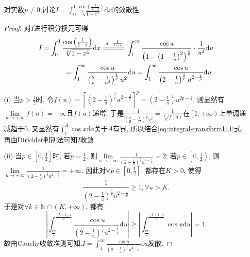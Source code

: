 \documentclass[../../main.tex]{subfiles}%
\begin{document}
\begin{example}
对实数$p\ne 0$,讨论$I = \int_0^1{\frac{\cos(\frac{1}{1 - x})}{\sqrt[p]{1 - x^2}}\mathrm{d}x}$的敛散性.
\end{example}
\begin{proof}

对$I$进行积分换元可得
\begin{align}
I=\int_0^1{\frac{\cos\left(\frac{1}{1-x}\right)}{\sqrt[p]{1-x^2}}\mathrm{d}x}\xlongequal{u=\frac{1}{1-x}}\int_1^{\infty}{\frac{\cos u}{\left( 1-\left( 1-\frac{1}{u} \right) ^2 \right) ^{\frac{1}{p}}}\cdot \frac{1}{u^2}\mathrm{d}u} \notag \\
=\int_1^{\infty}{\frac{\cos u}{\left( \frac{2}{u}-\frac{1}{u^2} \right) ^{\frac{1}{p}}u^2}\mathrm{d}u}=\int_1^{\infty}{\frac{\cos u}{\left( 2-\frac{1}{u} \right) ^{\frac{1}{p}}u^{2-\frac{1}{p}}}\mathrm{d}u}.\label{eq:integral-transform111}
\end{align}

(i) 当$p>\frac{1}{2}$时, 令$f\left( u \right) =\left[ \left( 2-\frac{1}{u} \right) ^{\frac{1}{p}}u^{2-\frac{1}{p}} \right] ^p=\left( 2-\frac{1}{u} \right) u^{2p-1}$, 则显然有$\underset{u\rightarrow +\infty}{\lim}f\left( u \right) =+\infty$且$f\left( u \right)$递增. 于是$\frac{1}{\left( \frac{2}{u}-\frac{1}{u^2} \right) ^{\frac{1}{p}}u^2}=\frac{1}{\sqrt[p]{f\left( u \right)}}$在$\left[ 1,+\infty \right)$上单调递减趋于$0$. 又显然有$\int_1^A{\cos x\mathrm{d}x}$关于$A$有界, 所以结合\eqref{eq:integral-transform111}式, 再由Dirichlet判别法可知$I$收敛.

(ii) 当$p\in \left[ 0,\frac{1}{2} \right]$时, 若$p=\frac{1}{2}$, 则$\underset{u\rightarrow +\infty}{\lim}\frac{1}{\left( 2-\frac{1}{u} \right) ^{\frac{1}{p}}u^{2-\frac{1}{p}}}=2$; 若$p\in \left[ 0,\frac{1}{2} \right)$, 则$\underset{u\rightarrow +\infty}{\lim}\frac{1}{\left( 2-\frac{1}{u} \right) ^{\frac{1}{p}}u^{2-\frac{1}{p}}}=+\infty$. 因此对$\forall p\in \left[ 0,\frac{1}{2} \right]$, 都存在$K>0$, 使得
$$\frac{1}{\left( 2-\frac{1}{u} \right) ^{\frac{1}{p}}u^{2-\frac{1}{p}}}\geqslant 1,\forall u>K.$$
于是对$\forall k\in \mathbb{N} \cap \left( K,+\infty \right)$, 都有
$$\left| \int_{\frac{k\pi}{2}}^{\frac{\left( k+1 \right) \pi}{2}}{\frac{\cos u}{\left( 2-\frac{1}{u} \right) ^{\frac{1}{p}}u^{2-\frac{1}{p}}}\mathrm{d}u} \right|\geqslant \left| \int_{\frac{k\pi}{2}}^{\frac{\left( k+1 \right) \pi}{2}}{\cos u\mathrm{d}u} \right|=1.$$
故由Cauchy收敛准则可知,$I=\int_1^{\infty}{\frac{\cos u}{\left( 2-\frac{1}{u} \right) ^{\frac{1}{p}}u^{2-\frac{1}{p}}}\mathrm{d}u}$发散.


\end{proof}
\end{document}
